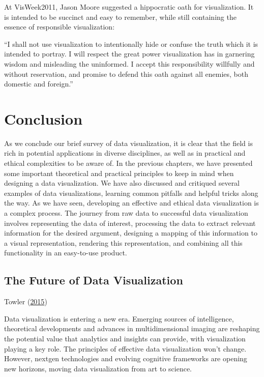 \documentclass[]{book}
\begin{document}
At VisWeek2011, Jason Moore suggested a hippocratic oath for
visualization. It is intended to be succinct and easy to remember, while
still containing the essence of responsible visualization:

``I shall not use visualization to intentionally hide or confuse the
truth which it is intended to portray. I will respect the great power
visualization has in garnering wisdom and misleading the uninformed. I
accept this responsibility willfully and without reservation, and
promise to defend this oath against all enemies, both domestic and
foreign.''

\chapter{Conclusion}\label{conclusion}

As we conclude our brief survey of data visualization, it is clear that
the field is rich in potential applications in diverse disciplines, as
well as in practical and ethical complexities to be aware of. In the
previous chapters, we have presented some important theoretical and
practical principles to keep in mind when designing a data
visualization. We have also discussed and critiqued several examples of
data visualizations, learning common pitfalls and helpful tricks along
the way. As we have seen, developing an effective and ethical data
visualization is a complex process. The journey from raw data to
successful data visualization involves representing the data of
interest, processing the data to extract relevant information for the
desired argument, designing a mapping of this information to a visual
representation, rendering this representation, and combining all this
functionality in an easy-to-use product.

\section{The Future of Data
Visualization}\label{the-future-of-data-visualization}

Towler (\protect\hyperlink{ref-future_viz}{2015})

Data visualization is entering a new era. Emerging sources of
intelligence, theoretical developments and advances in multidimensional
imaging are reshaping the potential value that analytics and insights
can provide, with visualization playing a key role. The principles of
effective data visualization won't change. However, nextgen technologies
and evolving cognitive frameworks are opening new horizons, moving data
visualization from art to science.
\end{document}
